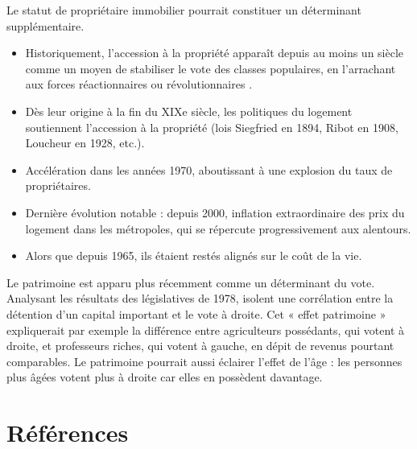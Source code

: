\documentclass[12pt]{article}
\begin{document}
Le statut de propriétaire immobilier pourrait constituer un déterminant supplémentaire. 
\begin{itemize}
\item Historiquement, l’accession à la propriété apparaît depuis au moins un siècle comme un moyen de stabiliser le vote des classes populaires, en l’arrachant aux forces réactionnaires ou révolutionnaires \cite{michel_cause_2006}.
\item Dès leur origine à la fin du XIXe siècle, les politiques du logement soutiennent l’accession à la propriété (lois Siegfried en 1894, Ribot en 1908, Loucheur en 1928, etc.).
\item Accélération dans les années 1970, aboutissant à une explosion du taux de propriétaires.
\item Dernière évolution notable : depuis 2000, inflation extraordinaire des prix du logement dans les métropoles, qui se répercute progressivement aux alentours.
\item Alors que depuis 1965, ils étaient restés alignés sur le coût de la vie.
\end{itemize}

Le patrimoine est apparu plus récemment comme un déterminant du vote. Analysant les résultats des législatives de 1978, \cite{capdevielle_france_1998} isolent une corrélation entre la détention d’un capital important et le vote à droite. Cet « effet patrimoine » expliquerait par exemple la différence entre agriculteurs possédants, qui votent à droite, et professeurs riches, qui votent à gauche, en dépit de revenus pourtant comparables. Le patrimoine pourrait aussi éclairer l’effet de l’âge : les personnes plus âgées votent plus à droite car elles en possèdent davantage.

\section{Références}

\printbibliography
\end{document}

